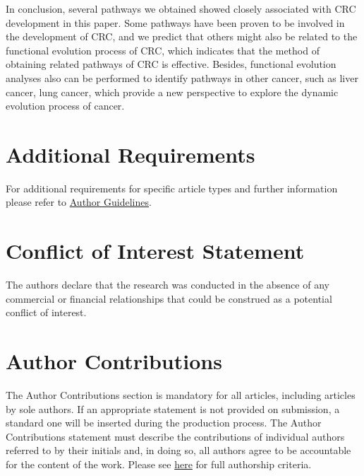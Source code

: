 \documentclass[utf8]{frontiersSCNS} %
\begin{document}
In conclusion, several pathways we obtained showed closely associated with CRC development in this paper. Some pathways have been proven to be involved in the development
of CRC, and we predict that others might also be related to
the functional evolution process of CRC, which indicates that the method of
obtaining related pathways of CRC is effective. Besides, functional evolution analyses also can be performed to identify pathways in other cancer, such as liver cancer, lung cancer, which provide a new perspective to explore the dynamic evolution process of cancer.


\section{Additional Requirements}

For additional requirements for specific article types and further information please refer to \href{http://www.frontiersin.org/about/AuthorGuidelines#AdditionalRequirements}{Author Guidelines}.

\section*{Conflict of Interest Statement}

The authors declare that the research was conducted in the absence of any commercial or financial relationships that could be construed as a potential conflict of interest.

\section*{Author Contributions}

The Author Contributions section is mandatory for all articles, including articles by sole authors. If an appropriate statement is not provided on submission, a standard one will be inserted during the production process. The Author Contributions statement must describe the contributions of individual authors referred to by their initials and, in doing so, all authors agree to be accountable for the content of the work. Please see  \href{http://home.frontiersin.org/about/author-guidelines#AuthorandContributors}{here} for full authorship criteria.
\end{document}
